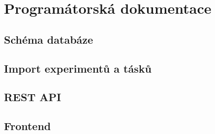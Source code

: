 \chapter{Programátorská dokumentace}
\section{Schéma databáze}
\section{Import experimentů a tásků}
\section{REST API}
\section{Frontend}
